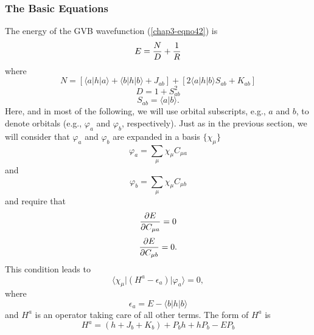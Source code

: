 \subsubsection{The Basic Equations}

The energy of the GVB wavefunction (\ref{chap3-eqno42}) is
\begin{equation}
E = {N \over D} + {1 \over R}
\end{equation}
where
\begin{equation}
N = \left[ \langle a \vert h \vert a \rangle + \langle b \vert h \vert 
b \rangle + J_{ab} \right] + \left[ 2 \langle a \vert h \vert b 
\rangle S_{ab} + K_{ab} \right]
\end{equation}
\begin{equation}
D = 1 + S^2_{ab}
\end{equation}
\begin{equation}
S_{ab} = \langle a \vert b \rangle .
\end{equation}
Here, and in most of the following, we will use orbital subscripts,
e.g., $a$ and $b$, to denote orbitals (e.g., $\varphi_a$ and
$\varphi_b$, respectively).  Just as in the previous section, we will
consider that $\varphi_a$ and $\varphi_b$ are expanded in a basis $\{
\chi_{\mu} \}$
\begin{equation}
\varphi_a = \sum_{\mu} \chi_{\mu} C_{\mu a}
\label{chap3-eqno43a}
\end{equation}
and
\begin{equation}
\varphi_b = \sum_{\mu} \chi_{\mu} C_{\mu b}
\label{chap3-eqno43b}
\end{equation}
and require that
\begin{equation}
{\partial E \over \partial C_{\mu a}} = 0
\end{equation}
\begin{equation}
{\partial E \over \partial C_{\mu b}} = 0 .
\end{equation}
This condition leads to
\begin{equation}
\langle \chi_{\mu} \vert \left( H^a - \epsilon_a \right) \vert 
\varphi_a \rangle = 0,
\label{chap3-eqno44}
\end{equation}
where
\begin{equation}
\epsilon_a = E - \langle b \vert h \vert b \rangle
\end{equation}
and $H^a$ is an operator taking care of all other terms.  The form 
of $H^a$ is
\begin{equation}
H^a = ( h + J_b + K_b) + P_ bh + h P_b - EP_b
\end{equation}
